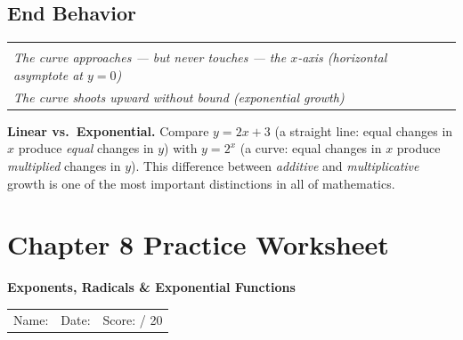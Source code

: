 \documentclass[12pt, letterpaper]{book}
\newcommand{\shortansline}{\underline{\hspace{3.5cm}}}
\begin{document}
\subsection*{End Behavior}

\begin{center}
\begin{tabular}{p{} p{}}
\begin{tcolorbox}[colback=red!5, colframe=red!60!black, arc=4pt,
                  title={\small As $x \to -\infty$}, fonttitle=\bfseries]
  \centering $y \to 0$\\[4pt]
  \small\itshape The curve approaches --- but never touches --- the $x$-axis
  (horizontal asymptote at $y=0$)
\end{tcolorbox}
&
\begin{tcolorbox}[colback=green!5, colframe=green!50!black, arc=4pt,
                  title={\small As $x \to +\infty$}, fonttitle=\bfseries]
  \centering $y \to +\infty$\\[4pt]
  \small\itshape The curve shoots upward without bound (exponential growth)
\end{tcolorbox}
\end{tabular}
\end{center}

\begin{storybox}
\textbf{Linear vs.\ Exponential.}\enspace
Compare $y = 2x+3$ (a straight line: equal changes in $x$ produce \emph{equal}
changes in $y$) with $y = 2^x$ (a curve: equal changes in $x$ produce
\emph{multiplied} changes in $y$). This difference between \emph{additive} and
\emph{multiplicative} growth is one of the most important distinctions in all of
mathematics.
\end{storybox}

\newpage
\section*{Chapter 8 Practice Worksheet}

\begin{center}
  {\large\bfseries Exponents, Radicals \& Exponential Functions}\\[6pt]
  \begin{tabular}{lll}
    Name: \shortansline & Date: \shortansline & Score: \shortansline / 20
  \end{tabular}
\end{center}
\end{document}
